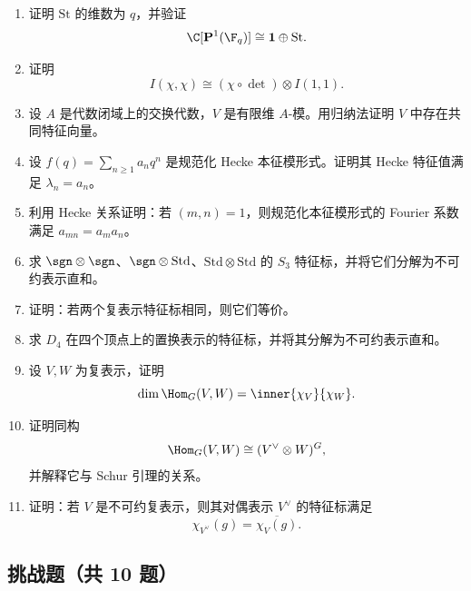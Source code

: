 \begin{enumerate}[label={\textbf{习题8.\arabic*.}}, wide=0pt, leftmargin=3.2em]
\item \medium 证明 $\mathrm{St}$ 的维数为 $q$，并验证
\[
\C[\mathbf{P}^1(\F_q)]\cong \mathbf{1}\oplus \mathrm{St}.
\]

\item \medium 证明
\[
I(\chi,\chi)\cong (\chi\circ\det)\otimes I(1,1).
\]

\item \medium 设 $A$ 是代数闭域上的交换代数，$V$ 是有限维 $A$-模。用归纳法证明 $V$ 中存在共同特征向量。

\item \medium 设 $f(q)=\sum_{n\ge 1}a_nq^n$ 是规范化 Hecke 本征模形式。证明其 Hecke 特征值满足 $\lambda_n=a_n$。

\item \medium 利用 Hecke 关系证明：若 $(m,n)=1$，则规范化本征模形式的 Fourier 系数满足 $a_{mn}=a_ma_n$。

\item \medium 求 $\sgn\otimes \sgn$、$\sgn\otimes \mathrm{Std}$、$\mathrm{Std}\otimes \mathrm{Std}$ 的 $S_3$ 特征标，并将它们分解为不可约表示直和。

\item \medium 证明：若两个复表示特征标相同，则它们等价。

\item \medium 求 $D_4$ 在四个顶点上的置换表示的特征标，并将其分解为不可约表示直和。

\item \medium 设 $V,W$ 为复表示，证明
\[
\dim \Hom_G(V,W)=\inner{\chi_V}{\chi_W}.
\]

\item \medium 证明同构
\[
\Hom_G(V,W)\cong (V^{\vee}\otimes W)^G,
\]
并解释它与 Schur 引理的关系。

\item \medium 证明：若 $V$ 是不可约复表示，则其对偶表示 $V^{\vee}$ 的特征标满足
\[
\chi_{V^{\vee}}(g)=\overline{\chi_V(g)}.
\]
\end{enumerate}

\subsection*{挑战题（共 10 题）}


